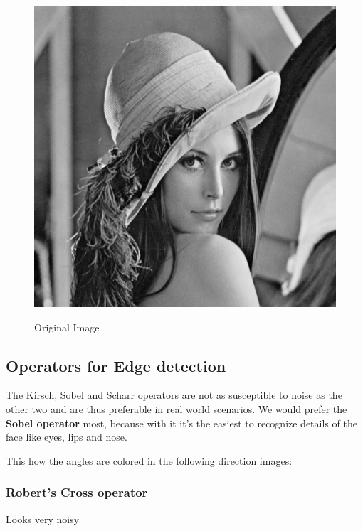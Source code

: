 \documentclass[a4paper,12pt]{article}
\begin{document}
	\begin{figure}
		\includegraphics[width=\colwidth]{lena}
		
		Original Image
	\end{figure}
	
	\subsection{Operators for Edge detection}
	
	The Kirsch, Sobel and Scharr operators are not as susceptible to noise as the other two and are thus preferable in real world scenarios. We would prefer the \textbf{Sobel operator} most, because with it it's the easiest to recognize details of the face like eyes, lips and nose.
	
	This how the angles are colored in the following direction images: \quad
	
%		
		\subsubsection{Robert's Cross operator}
		Looks very noisy
		
\end{document}
